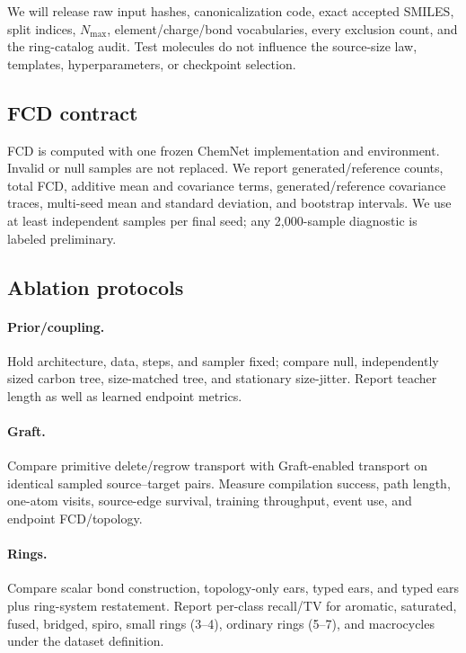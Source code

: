 \documentclass{article}
\theoremstyle{definition}
\theoremstyle{remark}
\begin{document}
We will release raw input hashes, canonicalization code, exact accepted SMILES, split indices, $N_{\max}$, element/charge/bond vocabularies, every exclusion count, and the ring-catalog audit. Test molecules do not influence the source-size law, templates, hyperparameters, or checkpoint selection.

\subsection{FCD contract}

FCD is computed with one frozen ChemNet implementation and environment. Invalid or null samples are not replaced. We report generated/reference counts, total FCD, additive mean and covariance terms, generated/reference covariance traces, multi-seed mean and standard deviation, and bootstrap intervals. We use at least \XXX independent samples per final seed; any 2,000-sample diagnostic is labeled preliminary.

\subsection{Ablation protocols}

\paragraph{Prior/coupling.}
Hold architecture, data, steps, and sampler fixed; compare null, independently sized carbon tree, size-matched tree, and stationary size-jitter. Report teacher length as well as learned endpoint metrics.

\paragraph{Graft.}
Compare primitive delete/regrow transport with Graft-enabled transport on identical sampled source--target pairs. Measure compilation success, path length, one-atom visits, source-edge survival, training throughput, event use, and endpoint FCD/topology.

\paragraph{Rings.}
Compare scalar bond construction, topology-only ears, typed ears, and typed ears plus ring-system restatement. Report per-class recall/TV for aromatic, saturated, fused, bridged, spiro, small rings (3--4), ordinary rings (5--7), and macrocycles under the dataset definition.
\end{document}
